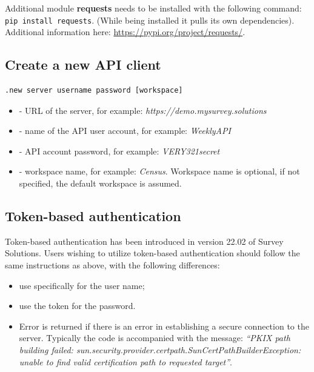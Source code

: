 Additional module \textbf{requests} needs to be installed with the following
command: \texttt{pip install requests}. (While being installed it pulls its
own dependencies). Additional information here:
\href{https://pypi.org/project/requests/}{https://pypi.org/project/requests/}.

\vskip16pt
\subsection{Create a new API client}
\begin{lstlisting}
.new server username password [workspace]
\end{lstlisting}

\paramsheader
\begin{itemize}
\item {} - URL of the server, for example: \textquotedbl\textit{https://demo.mysurvey.solutions}\textquotedbl
\item {} - name of the API user account, for example: \textquotedbl\textit{WeeklyAPI}\textquotedbl
\item {} - API account password, for example: \textquotedbl\textit{VERY321secret}\textquotedbl
\item {} - workspace name, for example: \textquotedbl\textit{Census}\textquotedbl. Workspace name is optional, if not specified, the default workspace is assumed.
\end{itemize}

\subsection{Token-based authentication}
Token-based authentication has been introduced in version 22.02 of Survey Solutions. Users wishing to utilize token-based authentication should follow the same instructions as above, with the following differences:
\begin{itemize}
  \item use specifically \textquotedbl *\textquotedbl \hspace{0.125cm} for the user name;
  \item use the token for the password.
\end{itemize}

\errheader
\begin{itemize}
    \item Error  is returned if there is an error in establishing a secure connection to the server. Typically the code is accompanied with the message: \textit{``PKIX path building failed: sun.security.provider.certpath.SunCertPathBuilderException: unable to find valid certification path to requested target''}.
\end{itemize}

